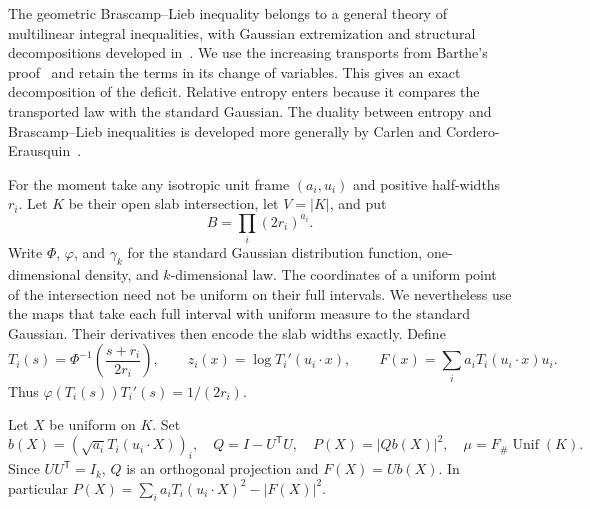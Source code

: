 \documentclass[11pt,a4paper]{article}
\theoremstyle{remark}\newtheorem{remark}[theorem]{Remark}
\numberwithin{equation}{section}
\begin{document}
The geometric Brascamp--Lieb inequality belongs to a general theory
of multilinear integral inequalities, with Gaussian extremization and
structural decompositions developed in~\cite{BrascampLieb1976,Lieb1990,BCCT2008}.
We use the increasing transports from Barthe's proof~\cite{Barthe1998}
and retain the terms in its change of variables. This gives an exact
decomposition of the deficit. Relative entropy enters because it
compares the transported law with the standard Gaussian. The duality
between entropy and Brascamp--Lieb inequalities is developed more
generally by Carlen and Cordero-Erausquin~\cite{CarlenCordero2009}.

For the moment take any isotropic unit frame $(a_i,u_i)$ and positive
half-widths $r_i$. Let $K$ be their open slab intersection, let $V=|K|$,
and put
\[
 B=\prod_i(2r_i)^{a_i}.
\]
Write $\Phi$, $\varphi$, and $\gamma_k$ for the standard Gaussian
distribution function, one-dimensional density, and $k$-dimensional law.
The coordinates of a uniform point of the intersection need not be
uniform on their full intervals. We nevertheless use the maps that
take each full interval with uniform measure to the standard Gaussian.
Their derivatives then encode the slab widths exactly. Define
\[
 T_i(s)=\Phi^{-1}\left(\frac{s+r_i}{2r_i}\right),
 \qquad z_i(x)=\log T_i'(u_i\cdot x),
 \qquad F(x)=\sum_i a_iT_i(u_i\cdot x)u_i.
\]
Thus $\varphi(T_i(s))T_i'(s)=1/(2r_i)$.

Let $X$ be uniform on $K$. Set
\[
 b(X)=(\sqrt{a_i}T_i(u_i\cdot X))_i,
 \quad Q=I-U^{\mathsf T}U,
 \quad P(X)=|Qb(X)|^2,
 \quad \mu=F_\#\operatorname{Unif}(K).
\]
Since $UU^{\mathsf T}=I_k$, $Q$ is an orthogonal projection and
$F(X)=Ub(X)$. In particular
$P(X)=\sum_i a_iT_i(u_i\cdot X)^2-|F(X)|^2$.
\end{document}
